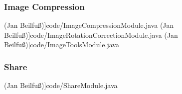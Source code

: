 	\subsubsection{Image Compression}
 (Jan Beilfuß)]{code/ImageCompressionModule.java}
 (Jan Beilfuß)]{code/ImageRotationCorrectionModule.java}
 (Jan Beilfuß)]{code/ImageToolsModule.java}
	\subsubsection{Share}
 (Jan Beilfuß)]{code/ShareModule.java}



